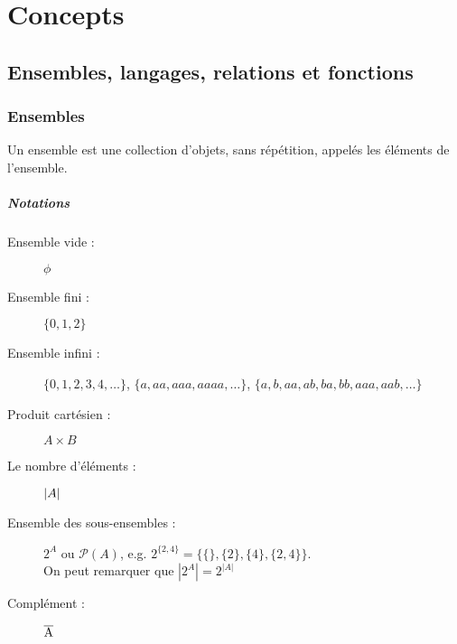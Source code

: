 
\chapter{Concepts}
\label{ch:concepts}

\section{Ensembles, langages, relations et fonctions}
\label{sec:ensembles_langages_relations_et_fonctions}

\subsection{Ensembles}
\label{subsec:ensembles}
Un ensemble est une collection d'objets, sans répétition, appelés les éléments
de l'ensemble.
\paragraph{Notations}

\begin{description}
	\item [Ensemble vide :] $\phi$
	\item [Ensemble fini :] $\{ 0, 1, 2\}$
	\item [Ensemble infini :] $\{ 0, 1, 2, 3, 4, \ldots\}$, $\{a, aa, aaa, aaaa, \ldots\}$, $\{a, b, aa, ab, ba, bb, aaa, aab, \ldots\}$
	\item [Produit cartésien :] $A \times B$
    \item [Le nombre d'éléments :] $\left\lvert A\right\lvert$
    \item [Ensemble des sous-ensembles :] $2^A$ ou $\mathcal{P}(A)$, e.g. $2^{\{2,4\}} = \{\{\}, \{2\}, \{4\}, \{2,4\}\}$. \\
      On peut remarquer que $|2^A| = 2^{|A|}$
	\item [Complément :] $\overline{\mathrm{A}}$
\end{description}


